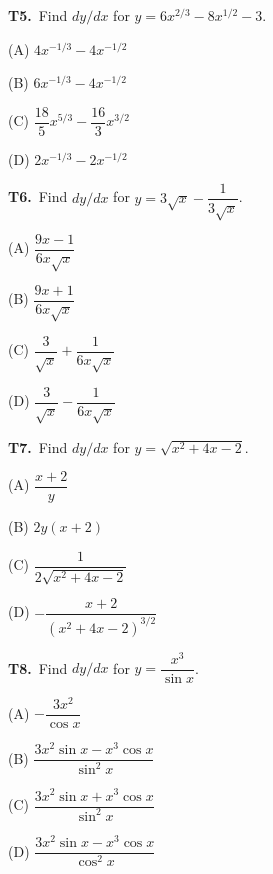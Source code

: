\documentclass[11pt]{article}
\begin{document}
\bigskip\noindent\textbf{T5.}\ Find $dy/dx$ for $y = 6x^{2/3} - 8x^{1/2} - 3$.
\begin{list}{}{\setlength{\leftmargin}{3em}\setlength{\labelwidth}{2.5em}\setlength{\itemsep}{0pt}\setlength{\topsep}{2pt}}
\item[(A)] $4x^{-1/3} - 4x^{-1/2}$
\item[(B)] $6x^{-1/3} - 4x^{-1/2}$
\item[(C)] $\dfrac{18}{5}x^{5/3} - \dfrac{16}{3}x^{3/2}$
\item[(D)] $2x^{-1/3} - 2x^{-1/2}$
\end{list}

\bigskip\noindent\textbf{T6.}\ Find $dy/dx$ for $y = 3\sqrt{x} - \dfrac{1}{3\sqrt{x}}$.
\begin{list}{}{\setlength{\leftmargin}{3em}\setlength{\labelwidth}{2.5em}\setlength{\itemsep}{0pt}\setlength{\topsep}{2pt}}
\item[(A)] $\dfrac{9x-1}{6x\sqrt{x}}$
\item[(B)] $\dfrac{9x+1}{6x\sqrt{x}}$
\item[(C)] $\dfrac{3}{\sqrt{x}} + \dfrac{1}{6x\sqrt{x}}$
\item[(D)] $\dfrac{3}{\sqrt{x}} - \dfrac{1}{6x\sqrt{x}}$
\end{list}

\bigskip\noindent\textbf{T7.}\ Find $dy/dx$ for $y = \sqrt{x^2+4x-2}$.
\begin{list}{}{\setlength{\leftmargin}{3em}\setlength{\labelwidth}{2.5em}\setlength{\itemsep}{0pt}\setlength{\topsep}{2pt}}
\item[(A)] $\dfrac{x+2}{y}$
\item[(B)] $2y(x+2)$
\item[(C)] $\dfrac{1}{2\sqrt{x^2+4x-2}}$
\item[(D)] $-\dfrac{x+2}{(x^2+4x-2)^{3/2}}$
\end{list}

\bigskip\noindent\textbf{T8.}\ Find $dy/dx$ for $y = \dfrac{x^3}{\sin x}$.
\begin{list}{}{\setlength{\leftmargin}{3em}\setlength{\labelwidth}{2.5em}\setlength{\itemsep}{0pt}\setlength{\topsep}{2pt}}
\item[(A)] $-\dfrac{3x^2}{\cos x}$
\item[(B)] $\dfrac{3x^2\sin x - x^3\cos x}{\sin^2 x}$
\item[(C)] $\dfrac{3x^2\sin x + x^3\cos x}{\sin^2 x}$
\item[(D)] $\dfrac{3x^2\sin x - x^3\cos x}{\cos^2 x}$
\end{list}
\end{document}
